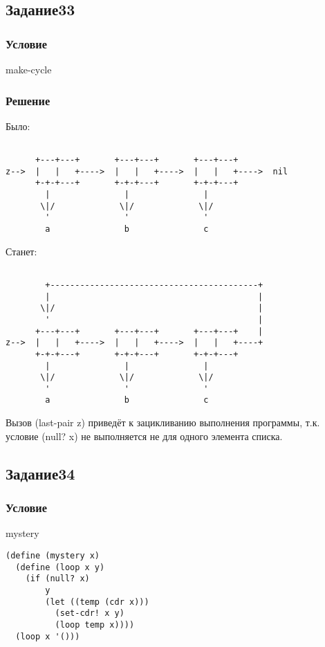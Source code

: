 \documentclass[10pt,a4paper]{article}
\begin{document}
\lstset{ %
basicstyle=\footnotesize,       %
frame=none
}


\subsection*{Задание33}
\subsubsection*{Условие}
make-cycle
\subsubsection*{Решение}

Было:
\begin{lstlisting}

      +---+---+       +---+---+       +---+---+
z-->  |   |   +---->  |   |   +---->  |   |   +---->  nil
      +-+-+---+       +-+-+---+       +-+-+---+
        |               |               |
       \|/             \|/             \|/
        '               '               '
        a               b               c

\end{lstlisting}

Станет:
\begin{lstlisting}

        +------------------------------------------+
        |                                          |
       \|/                                         |
        '                                          |
      +---+---+       +---+---+       +---+---+    |
z-->  |   |   +---->  |   |   +---->  |   |   +----+
      +-+-+---+       +-+-+---+       +-+-+---+
        |               |               |
       \|/             \|/             \|/
        '               '               '
        a               b               c

\end{lstlisting}

Вызов (last-pair z) приведёт к зацикливанию выполнения программы,
т.к. условие (null? x) не выполняется не для одного элемента списка.

\subsection*{Задание34}
\subsubsection*{Условие}
mystery
\begin{lstlisting}
(define (mystery x)
  (define (loop x y)
    (if (null? x)
        y
        (let ((temp (cdr x)))
          (set-cdr! x y)
          (loop temp x))))
  (loop x '()))
\end{lstlisting}
\end{document}
